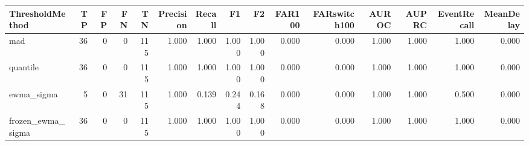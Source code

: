 \begin{tabular}{lrrrrrrrrrrrrrr}
\toprule
ThresholdMethod & TP & FP & FN & TN & Precision & Recall & F1 & F2 & FAR100 & FARswitch100 & AUROC & AUPRC & EventRecall & MeanDelay \\
\midrule
mad & 36 & 0 & 0 & 115 & 1.000 & 1.000 & 1.000 & 1.000 & 0.000 & 0.000 & 1.000 & 1.000 & 1.000 & 0.000 \\
quantile & 36 & 0 & 0 & 115 & 1.000 & 1.000 & 1.000 & 1.000 & 0.000 & 0.000 & 1.000 & 1.000 & 1.000 & 0.000 \\
ewma_sigma & 5 & 0 & 31 & 115 & 1.000 & 0.139 & 0.244 & 0.168 & 0.000 & 0.000 & 1.000 & 1.000 & 0.500 & 0.000 \\
frozen_ewma_sigma & 36 & 0 & 0 & 115 & 1.000 & 1.000 & 1.000 & 1.000 & 0.000 & 0.000 & 1.000 & 1.000 & 1.000 & 0.000 \\
\bottomrule
\end{tabular}
